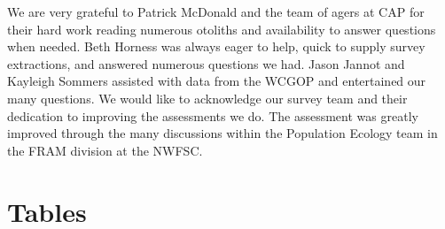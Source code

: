 \documentclass[12pt,]{article}
\begin{document}
We are very grateful to Patrick McDonald and the team of agers at CAP
for their hard work reading numerous otoliths and availability to answer
questions when needed. Beth Horness was always eager to help, quick to
supply survey extractions, and answered numerous questions we had. Jason
Jannot and Kayleigh Sommers assisted with data from the WCGOP and
entertained our many questions. We would like to acknowledge our survey
team and their dedication to improving the assessments we do. The
assessment was greatly improved through the many discussions within the
Population Ecology team in the FRAM division at the NWFSC.

\newpage

\FloatBarrier

\section{Tables}\label{tables}
\end{document}
